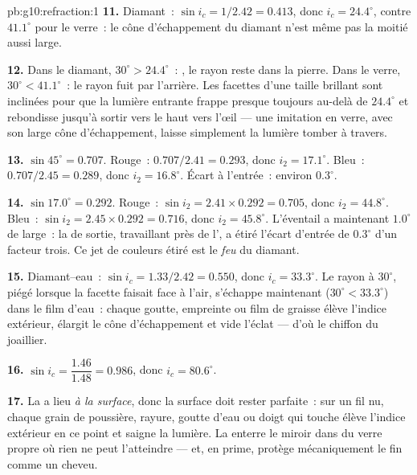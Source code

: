\begin{solution}{pb:g10:refraction:1}
\textbf{11.} Diamant~: $\sin i_c = 1/2.42 = 0.413$, donc
$i_c = 24.4^\circ$, contre $41.1^\circ$ pour le verre~: le cône
d'échappement du diamant n'est même pas la moitié aussi large.

\textbf{12.} Dans le diamant, $30^\circ > 24.4^\circ$~: , le rayon reste dans la pierre. Dans le verre,
$30^\circ < 41.1^\circ$~: le rayon fuit par l'arrière. Les facettes
d'une taille brillant sont inclinées pour que la lumière entrante
frappe presque toujours au-delà de $24.4^\circ$ et rebondisse jusqu'à
sortir vers le haut vers l'œil --- une imitation en verre, avec son
large cône d'échappement, laisse simplement la lumière tomber à
travers.

\textbf{13.} $\sin 45^\circ = 0.707$. Rouge~: $0.707/2.41 = 0.293$,
donc $i_2 = 17.1^\circ$. Bleu~: $0.707/2.45 = 0.289$, donc
$i_2 = 16.8^\circ$. Écart à l'entrée~: environ $0.3^\circ$.

\textbf{14.} $\sin 17.0^\circ = 0.292$. Rouge~: $\sin i_2 = 2.41
\times 0.292 = 0.705$, donc $i_2 = 44.8^\circ$. Bleu~:
$\sin i_2 = 2.45 \times 0.292 = 0.716$, donc $i_2 = 45.8^\circ$.
L'éventail a maintenant $1.0^\circ$ de large~: la 
de sortie, travaillant près de l', a étiré
l'écart d'entrée de $0.3^\circ$ d'un facteur trois. Ce jet de couleurs
étiré est le \emph{feu} du diamant.

\textbf{15.} Diamant--eau~: $\sin i_c = 1.33/2.42 = 0.550$, donc
$i_c = 33.3^\circ$. Le rayon à $30^\circ$, piégé lorsque la facette
faisait face à l'air, s'échappe maintenant ($30^\circ < 33.3^\circ$)
dans le film d'eau~: chaque goutte, empreinte ou film de graisse élève
l'indice extérieur, élargit le cône d'échappement et vide l'éclat ---
d'où le chiffon du joaillier.

\textbf{16.} $\sin i_c = \dfrac{1.46}{1.48} = 0.986$, donc
$i_c = 80.6^\circ$.

\textbf{17.} La  a lieu \emph{à la
surface}, donc la surface doit rester parfaite~: sur un fil nu, chaque
grain de poussière, rayure, goutte d'eau ou doigt qui touche élève
l'indice extérieur en ce point et saigne la lumière. La
 enterre le miroir dans du verre propre où rien ne peut
l'atteindre --- et, en prime, protège mécaniquement le
 fin comme un cheveu.


\end{solution}
